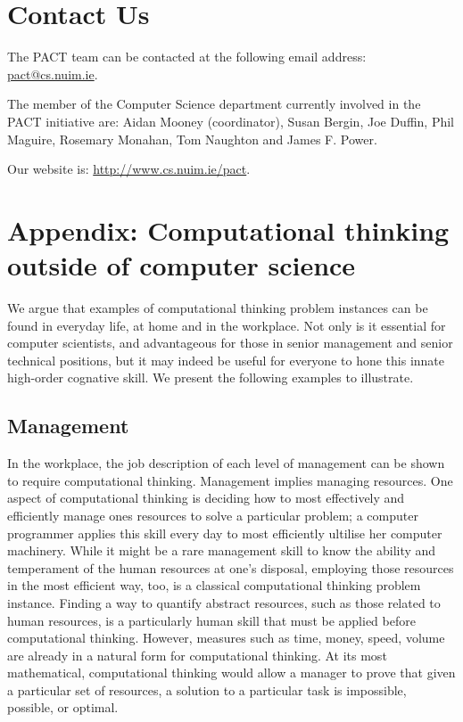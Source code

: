 \documentclass[a4paper]{article}
\begin{document}
\section{Contact Us} \label{Sect:ContactUs}
The PACT team can be contacted at the following email address: \url{pact@cs.nuim.ie}.

The member of the Computer Science department currently involved in the PACT initiative are:
Aidan Mooney (coordinator),
Susan Bergin,
Joe Duffin,
Phil Maguire,
Rosemary Monahan,
Tom Naughton and
James F. Power. 

Our website is: \url{http://www.cs.nuim.ie/pact}.





\appendix

\newpage

\section{Appendix: Computational thinking outside of computer science}\label{apx:CTOutside}

We argue that examples of computational thinking problem instances can be found in everyday life, at home and in the workplace. Not only is it essential for computer scientists, and advantageous for those in senior management and senior technical positions, but it may indeed be useful for everyone to hone this innate high-order cognative skill. We present the following examples to illustrate.

\subsection{Management}

In the workplace, the job description of each level of management can be shown to require computational thinking.
Management implies managing resources.
One aspect of computational thinking is deciding how to most effectively and efficiently manage ones resources to solve a particular problem; a computer programmer applies this skill every day to most efficiently ultilise her computer machinery.
While it might be a rare management skill to know the ability and temperament of the human resources at one's disposal, employing those resources in the most efficient way, too, is a classical computational thinking problem instance.
Finding a way to quantify abstract resources, such as those related to human resources, is a particularly human skill that must be applied before computational thinking.
However, measures such as time, money, speed, volume are already in a natural form for computational thinking.
At its most mathematical, computational thinking would allow a manager to prove that given a particular set of resources, a solution to a particular task is impossible, possible, or optimal.
\end{document}
